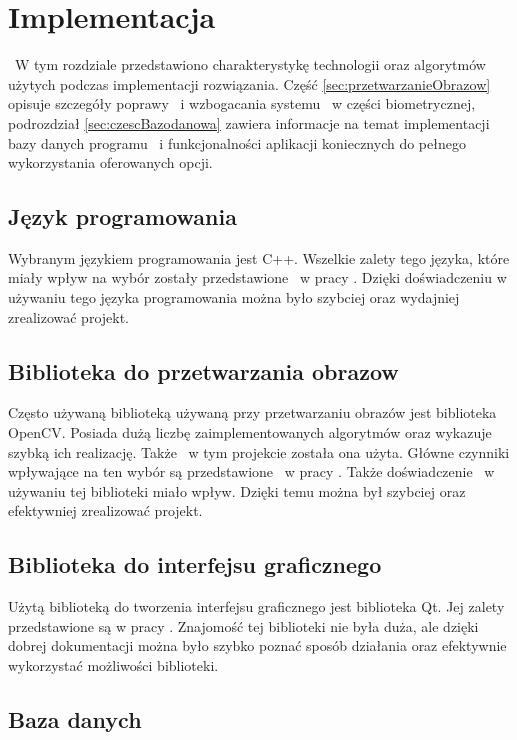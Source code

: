 \chapter{Implementacja}
\label{cha:projekt}
~W tym rozdziale przedstawiono charakterystykę technologii oraz algorytmów użytych podczas implementacji rozwiązania. Część \ref{sec:przetwarzanieObrazow} opisuje szczegóły poprawy ~i wzbogacania systemu ~w części biometrycznej, podrozdział \ref{sec:czescBazodanowa} zawiera informacje na temat implementacji bazy danych programu ~i funkcjonalności aplikacji koniecznych do pełnego wykorzystania oferowanych opcji.

\section{Język programowania}
\label{sec:jezykProgramowania}
Wybranym językiem programowania jest C++. Wszelkie zalety tego języka, które miały wpływ na wybór zostały przedstawione ~w pracy \cite{Gl11}. Dzięki doświadczeniu w używaniu tego języka programowania można było szybciej oraz wydajniej zrealizować projekt.

\section{Biblioteka do przetwarzania obrazow}
\label{sec:bibliotekaObrazow}
Często używaną biblioteką używaną przy przetwarzaniu obrazów jest biblioteka OpenCV. Posiada dużą liczbę zaimplementowanych algorytmów oraz wykazuje szybką ich realizację. Także ~w tym projekcie została ona użyta. Główne czynniki wpływające na ten wybór są przedstawione ~w pracy \cite{Gl11}. Także doświadczenie ~w używaniu tej biblioteki miało wpływ. Dzięki temu można był szybciej oraz efektywniej zrealizować projekt.

\section{Biblioteka do interfejsu graficznego}
\label{sec:interfejsGraficzny}
Użytą biblioteką do tworzenia interfejsu graficznego jest biblioteka Qt. Jej zalety przedstawione są w pracy \cite{Gl11}. Znajomość tej biblioteki nie była duża, ale dzięki dobrej dokumentacji można było szybko poznać sposób działania oraz efektywnie wykorzystać możliwości biblioteki.

\section{Baza danych}
\label{sec:bazaDanych}

